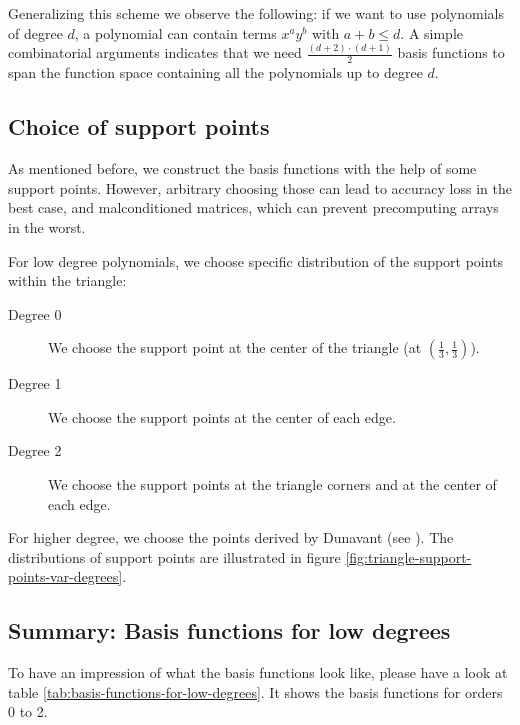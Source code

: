 \documentclass{article}
\begin{document}
Generalizing this scheme we observe the following: if we want to use polynomials of degree $d$, a polynomial can contain terms $x^a y^b$ with $a+b \leq d$. A simple combinatorial arguments indicates that we need $\frac{(d+2) \cdot (d+1)}{2}$ basis functions to span the function space containing all the polynomials up to degree $d$.

\subsection{Choice of support points}
\label{sec:choice-support-points}

As mentioned before, we construct the basis functions with the help of some support points. However, arbitrary choosing those can lead to accuracy loss in the best case, and malconditioned matrices, which can prevent precomputing arrays in the worst.

For low degree polynomials, we choose specific distribution of the support points within the triangle:
\begin{description}
\item[Degree 0] We choose the support point at the center of the triangle (at $\left(\frac{1}{3}, \frac{1}{3}\right)$).
\item[Degree 1] We choose the support points at the center of each edge.
\item[Degree 2] We choose the support points at the triangle corners and at the center of each edge.
\end{description}

For higher degree, we choose the points derived by Dunavant (see \cite{dunavant1985high}). The distributions of support points are illustrated in figure \ref{fig:triangle-support-points-var-degrees}.

\subsection{Summary: Basis functions for low degrees}
\label{sec:basis-functions-for-low-degrees}

To have an impression of what the basis functions look like, please have a look at table \ref{tab:basis-functions-for-low-degrees}. It shows the basis functions for orders 0 to 2.
\end{document}
